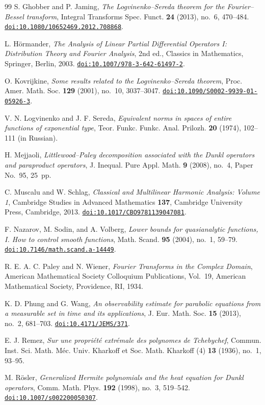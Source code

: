 \documentclass[12pt]{article}
\newcommand{\doi}[1]{\href{https://doi.org/#1}{\nolinkurl{doi:#1}}}
\begin{document}
\begin{thebibliography}{99}
S. Ghobber and P. Jaming, \emph{The Logvinenko--Sereda theorem for the Fourier--Bessel transform}, Integral Transforms Spec. Funct. \textbf{24} (2013), no.~6, 470--484. \doi{10.1080/10652469.2012.708868}.

L. H\"ormander, \emph{The Analysis of Linear Partial Differential Operators I: Distribution Theory and Fourier Analysis}, 2nd ed., Classics in Mathematics, Springer, Berlin, 2003. \doi{10.1007/978-3-642-61497-2}.

O. Kovrijkine, \emph{Some results related to the Logvinenko--Sereda theorem}, Proc. Amer. Math. Soc. \textbf{129} (2001), no.~10, 3037--3047. \doi{10.1090/S0002-9939-01-05926-3}.

V. N. Logvinenko and J. F. Sereda, \emph{Equivalent norms in spaces of entire functions of exponential type}, Teor. Funkc. Funkc. Anal. Prilozh. \textbf{20} (1974), 102--111 (in Russian).

H. Mejjaoli, \emph{Littlewood--Paley decomposition associated with the Dunkl operators and paraproduct operators}, J. Inequal. Pure Appl. Math. \textbf{9} (2008), no.~4, Paper No.~95, 25~pp.

C. Muscalu and W. Schlag, \emph{Classical and Multilinear Harmonic Analysis: Volume 1}, Cambridge Studies in Advanced Mathematics \textbf{137}, Cambridge University Press, Cambridge, 2013. \doi{10.1017/CBO9781139047081}.

F. Nazarov, M. Sodin, and A. Volberg, \emph{Lower bounds for quasianalytic functions, I. How to control smooth functions}, Math. Scand. \textbf{95} (2004), no.~1, 59--79. \doi{10.7146/math.scand.a-14449}.

R. E. A. C. Paley and N. Wiener, \emph{Fourier Transforms in the Complex Domain}, American Mathematical Society Colloquium Publications, Vol.~19, American Mathematical Society, Providence, RI, 1934.

K. D. Phung and G. Wang, \emph{An observability estimate for parabolic equations from a measurable set in time and its applications}, J. Eur. Math. Soc. \textbf{15} (2013), no.~2, 681--703. \doi{10.4171/JEMS/371}.

E. J. Remez, \emph{Sur une propri\'et\'e extr\'emale des polynomes de Tchebychef}, Commun. Inst. Sci. Math. M\'ec. Univ. Kharkoff et Soc. Math. Kharkoff (4) \textbf{13} (1936), no.~1, 93--95.

M. R\"osler, \emph{Generalized Hermite polynomials and the heat equation for Dunkl operators}, Comm. Math. Phys. \textbf{192} (1998), no.~3, 519--542. \doi{10.1007/s002200050307}.


\end{thebibliography}
\end{document}
